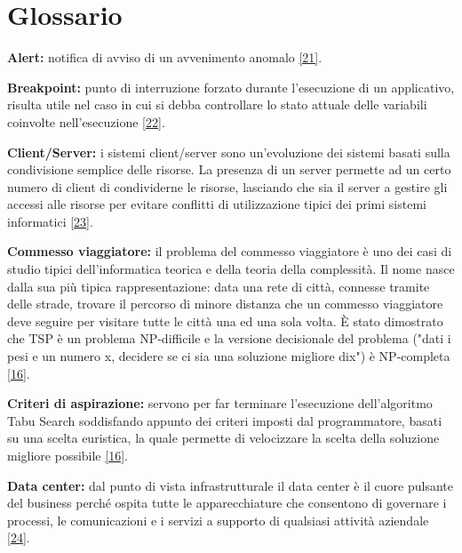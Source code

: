 \chapter{Glossario}

\begin{description}
    \item \label{Alert} \textbf{Alert:} notifica di avviso di un avvenimento anomalo \hyperref[alert]{[21]}.
    \item \label{Breakpoint} \textbf{Breakpoint:} punto di interruzione forzato durante l'esecuzione di un applicativo, risulta utile nel caso in cui si debba controllare lo stato attuale delle
     variabili coinvolte nell'esecuzione \hyperref[breakpoint]{[22]}.
    \item \label{Client/Server} \textbf{Client/Server:} i sistemi client/server sono un'evoluzione dei sistemi basati sulla condivisione semplice delle risorse. La presenza di un server permette ad un
     certo numero di client di condividerne le risorse, lasciando che sia il server a gestire gli accessi alle risorse per evitare conflitti di utilizzazione tipici dei primi 
     sistemi informatici \hyperref[client/server]{[23]}.
    \item \label{Commesso viaggiatore} \textbf{Commesso viaggiatore:} il problema del commesso viaggiatore è uno
    dei casi di studio tipici dell’informatica teorica e della teoria della complessità. Il
    nome nasce dalla sua più tipica rappresentazione: data una rete di città, connesse
    tramite delle strade, trovare il percorso di minore distanza che un commesso
    viaggiatore deve seguire per visitare tutte le città una ed una sola volta. È
    stato dimostrato che TSP è un problema NP-difficile e la versione decisionale del
    problema ("dati i pesi e un numero x, decidere se ci sia una soluzione migliore dix") è NP-completa \hyperref[slide]{[16]}.
    
    \item \label{Criteri di aspirazione} \textbf{Criteri di aspirazione:} servono per far terminare l'esecuzione dell'algoritmo Tabu Search soddisfando appunto dei criteri imposti dal programmatore, basati su una scelta
    euristica, la quale permette di velocizzare la scelta della soluzione migliore possibile \hyperref[slide]{[16]}.
    
    \item \label{Data center} \textbf{Data center:} dal punto di vista infrastrutturale il data center è il cuore pulsante del business perché ospita tutte le apparecchiature che consentono di governare i processi,
    le comunicazioni e i servizi a supporto di qualsiasi attività aziendale \hyperref[datacenter]{[24]}.
    

\end{description}
